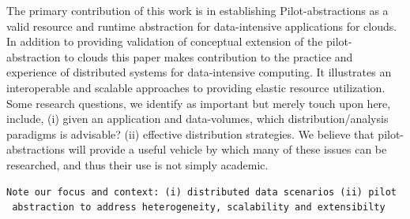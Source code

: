 \documentclass[times]{cpeauth}
\newcommand{\pilot}{Pilot\xspace}
\begin{document}
The primary contribution of this work is in establishing
\pilot-abstractions as a valid resource and runtime abstraction for
data-intensive applications for clouds.  In addition to providing
validation of conceptual extension of the pilot-abstraction to clouds
this paper makes contribution to the practice and experience of
distributed systems for data-intensive computing. It illustrates an
interoperable and scalable approaches to providing elastic resource
utilization. Some research questions, we identify as important but
merely touch upon here, include, (i) given an application and
data-volumes, which distribution/analysis paradigms is advisable?
(ii) effective distribution strategies. We believe that
pilot-abstractions will provide a useful vehicle by which many of
these issues can be researched, and thus their use is not simply
academic.




\begin{verbatim}
Note our focus and context: (i) distributed data scenarios (ii) pilot
 abstraction to address heterogeneity, scalability and extensibilty
\end{verbatim}

\end{document}
